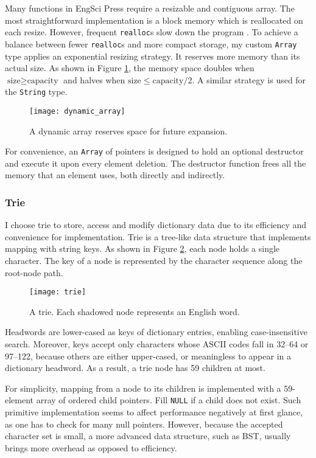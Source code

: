 \documentclass[../main.tex]{subfiles}
\begin{document}
Many functions in EngSci Press require a resizable and contiguous array. The most straightforward implementation is a block memory which is reallocated on each resize. However, frequent \texttt{realloc}s slow down the program \cite{bib:realloc_cost}. To achieve a balance between fewer \texttt{realloc}s and more compact storage, my custom \texttt{Array} type applies an exponential resizing strategy. It reserves more memory than its actual size. As shown in Figure \ref{fig:dynamic_array}, the memory space doubles when $\textrm{size} \geq \textrm{capacity}$ and halves when $\textrm{size} \leq \textrm{capacity} / 2$. A similar strategy is used for the \texttt{String} type.

\begin{figure}
	\centering
	\texttt{[image: dynamic\_array]}
	\caption{A dynamic array reserves space for future expansion.}
	\label{fig:dynamic_array}
\end{figure}

For convenience, an \texttt{Array} of pointers is designed to hold an optional destructor and execute it upon every element deletion. The destructor function frees all the memory that an element uses, both directly and indirectly.

\subsubsection{Trie}

I choose trie to store, access and modify dictionary data due to its efficiency \cite{bib:trie_efficiency} and convenience for implementation. Trie is a tree-like data structure that implements mapping with string keys. As shown in Figure \ref{fig:trie}, each node holds a single character. The key of a node is represented by the character sequence along the root-node path.

\begin{figure}
	\centering
	\texttt{[image: trie]}
	\caption{A trie. Each shadowed node represents an English word.}
	\label{fig:trie}
\end{figure}

Headwords are lower-cased as keys of dictionary entries, enabling case-insensitive search. Moreover, keys accept only characters whose ASCII codes fall in 32--64 or 97--122, because others are either upper-cased, or meaningless to appear in a dictionary headword. As a result, a trie node has 59 children at most.

For simplicity, mapping from a node to its children is implemented with a 59-element array of ordered child pointers. Fill \texttt{NULL} if a child does not exist. Such primitive implementation seems to affect performance negatively at first glance, as one has to check for many null pointers. However, because the accepted character set is small, a more advanced data structure, such as BST, usually brings more overhead as opposed to efficiency.
\end{document}
